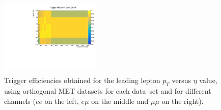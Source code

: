 \documentclass[a4paper, 10pt, openright]{report}
\begin{document}
\begin{figure}[htbp]
\begin{center}
{\begin{minipage}[b]{.32\textwidth}
\begin{center}
\end{center}
\end{minipage} \hfill
\begin{minipage}[b]{.32\textwidth}
\begin{center}
\includegraphics[width=4.8cm, height=3.8cm]{figs/triggEff_2018_mm.pdf}
\end{center}
\end{minipage}
} \hfill
\caption{Trigger efficiencies obtained for the leading lepton $p_T$ versus $\eta$ value, using orthogonal MET datasets for each data\
set and for different channels ($ee$ on the left, $e \mu$ on the middle and $\mu \mu$ on the right).}
\label{fig:TriggEff2D}
\end{center}
\end{figure}

\end{document}
